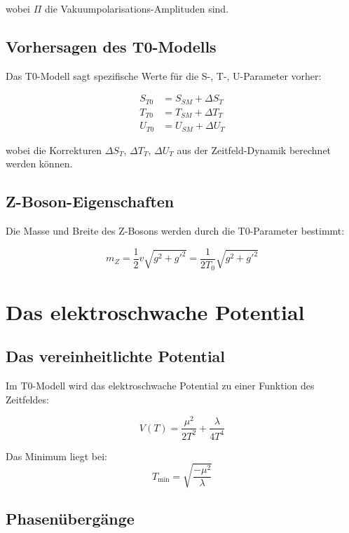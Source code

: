 \documentclass[12pt,a4paper]{report}
\begin{document}
wobei $\Pi$ die Vakuumpolarisations-Amplituden sind.

\subsection{Vorhersagen des T0-Modells}

Das T0-Modell sagt spezifische Werte für die S-, T-, U-Parameter vorher:

\begin{align}
	S_{T0} &= S_{SM} + \Delta S_T \\
	T_{T0} &= T_{SM} + \Delta T_T \\
	U_{T0} &= U_{SM} + \Delta U_T
\end{align}

wobei die Korrekturen $\Delta S_T$, $\Delta T_T$, $\Delta U_T$ aus der Zeitfeld-Dynamik berechnet werden können.

\subsection{Z-Boson-Eigenschaften}

Die Masse und Breite des Z-Bosons werden durch die T0-Parameter bestimmt:

\begin{equation}
	m_Z = \frac{1}{2}v\sqrt{g^2 + g'^2} = \frac{1}{2T_0}\sqrt{g^2 + g'^2}
\end{equation}

\section{Das elektroschwache Potential}

\subsection{Das vereinheitlichte Potential}

Im T0-Modell wird das elektroschwache Potential zu einer Funktion des Zeitfeldes:

\begin{equation}
	V(T) = \frac{\mu^2}{2T^2} + \frac{\lambda}{4T^4}
\end{equation}

Das Minimum liegt bei:
\begin{equation}
	T_{\min} = \sqrt{\frac{-\mu^2}{\lambda}}
\end{equation}

\subsection{Phasenübergänge}
\end{document}
